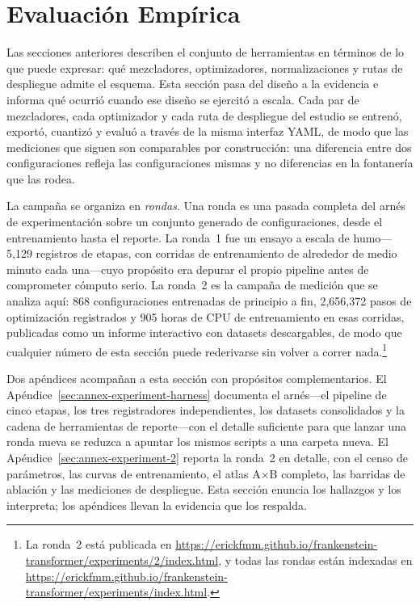 \section{Evaluación Empírica}
\label{sec:empirical-evaluation}

Las secciones anteriores describen el conjunto de herramientas en términos de lo que puede expresar: qué mezcladores, optimizadores, normalizaciones y rutas de despliegue admite el esquema. Esta sección pasa del diseño a la evidencia e informa qué ocurrió cuando ese diseño se ejercitó a escala. Cada par de mezcladores, cada optimizador y cada ruta de despliegue del estudio se entrenó, exportó, cuantizó y evaluó a través de la misma interfaz YAML, de modo que las mediciones que siguen son comparables por construcción: una diferencia entre dos configuraciones refleja las configuraciones mismas y no diferencias en la fontanería que las rodea.

La campaña se organiza en \emph{rondas}. Una ronda es una pasada completa del arnés de experimentación sobre un conjunto generado de configuraciones, desde el entrenamiento hasta el reporte. La ronda~1 fue un ensayo a escala de humo---5{,}129 registros de etapas, con corridas de entrenamiento de alrededor de medio minuto cada una---cuyo propósito era depurar el propio pipeline antes de comprometer cómputo serio. La ronda~2 es la campaña de medición que se analiza aquí: 868 configuraciones entrenadas de principio a fin, 2{,}656{,}372 pasos de optimización registrados y 905 horas de CPU de entrenamiento en esas corridas, publicadas como un informe interactivo con datasets descargables, de modo que cualquier número de esta sección puede rederivarse sin volver a correr nada.\footnote{La ronda~2 está publicada en \url{https://erickfmm.github.io/frankenstein-transformer/experiments/2/index.html}, y todas las rondas están indexadas en \url{https://erickfmm.github.io/frankenstein-transformer/experiments/index.html}.}

Dos apéndices acompañan a esta sección con propósitos complementarios. El Apéndice~\ref{sec:annex-experiment-harness} documenta el arnés---el pipeline de cinco etapas, los tres registradores independientes, los datasets consolidados y la cadena de herramientas de reporte---con el detalle suficiente para que lanzar una ronda nueva se reduzca a apuntar los mismos scripts a una carpeta nueva. El Apéndice~\ref{sec:annex-experiment-2} reporta la ronda~2 en detalle, con el censo de parámetros, las curvas de entrenamiento, el atlas A$\times$B completo, las barridas de ablación y las mediciones de despliegue. Esta sección enuncia los hallazgos y los interpreta; los apéndices llevan la evidencia que los respalda.

